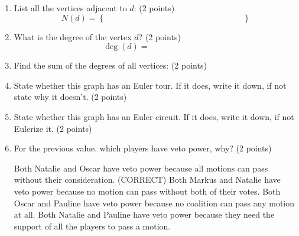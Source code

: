 \documentclass[12pt]{exam}
\begin{document}
\begin{enumerate}
\begin{enumerate}
\begin{figure}[h!]
\begin{tikzpicture}[x=0.75pt,y=0.75pt,yscale=-1,xscale=1]
    
    \end{tikzpicture}
    
    


\end{figure}
\vfill
\item List all the vertices adjacent to $d$: (2 points)
$$N(d)=\left\lbrace\hspace{7cm}\right\rbrace$$
\vfill
\item What is the degree of the vertex $d$? (2 points)
$$\deg(d)=\hspace{3cm}$$
\vfill
\item Find the sum of the degrees of all vertices: (2 points)
\begin{checkboxes}
\end{checkboxes}
\vfill
\item State whether this graph has an Euler tour. If it does, write it down, if not state why it doesn't. (2 points)
    \vspace{7em}
\vfill
\item State whether this graph has an Euler circuit. If it does, write it down, if not Eulerize it. (2 points)
    \vspace{7em}
\vfill
\item \label{lastQnSec2} For the previous value, which players have veto power, why? (2 points)
\begin{checkboxes}
    \choice Both Natalie and Oscar have veto power because all motions can pass without their consideration.
    \choice (CORRECT) Both Markus and Natalie have veto power because no motion can pass without both of their votes.
    \choice Both Oscar and Pauline have veto power because no coalition can pass any motion at all.
    \choice Both Natalie and Pauline have veto power because they need the support of all the players to pass a motion.
\end{checkboxes}
\vfill
\end{enumerate}
\newpage


\end{enumerate}
\end{document}
